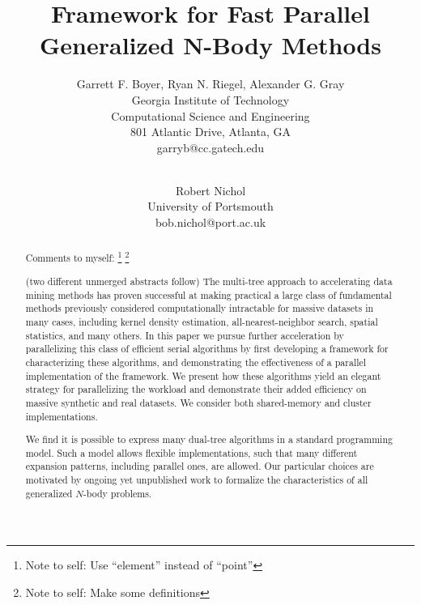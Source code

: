 \documentclass[times, 10pt,twocolumn]{article}
\newcommand{\authornote}[1]{\footnote{Note to self: #1}}
\begin{document}
\title{Framework for Fast Parallel Generalized N-Body Methods}

\author{Garrett F. Boyer, Ryan N. Riegel, Alexander G. Gray
\\ Georgia Institute of Technology
\\ Computational Science and Engineering
\\ 801 Atlantic Drive, Atlanta, GA
\\ garryb@cc.gatech.edu
\\
\and
\\ Robert Nichol
\\ University of Portsmouth
\\ bob.nichol@port.ac.uk
}

\maketitle
\thispagestyle{empty}

\begin{abstract}

Comments to myself:
\authornote{Use ``element'' instead of ``point''}
\authornote{Make some definitions}

(two different unmerged abstracts follow)
The multi-tree approach to accelerating data mining methods has proven successful at making practical a large class of fundamental methods previously considered computationally intractable for massive datasets in many cases, including kernel density estimation, all-nearest-neighbor search, spatial statistics, and many others.
In this paper we pursue further acceleration by parallelizing this class of efficient serial algorithms by first developing a framework for characterizing these algorithms, and demonstrating the effectiveness of a parallel implementation of the framework.
We present how these algorithms yield an elegant strategy for parallelizing the workload and demonstrate their added efficiency on massive synthetic and real datasets.
We consider both shared-memory and cluster implementations.

We find it is possible to express many dual-tree algorithms in a standard programming model.
Such a model allows flexible implementations, such that many different expansion patterns, including parallel ones, are allowed.
Our particular choices are motivated by ongoing yet unpublished work to formalize the characteristics of all generalized $N$-body problems.
\end{abstract}
\end{document}
